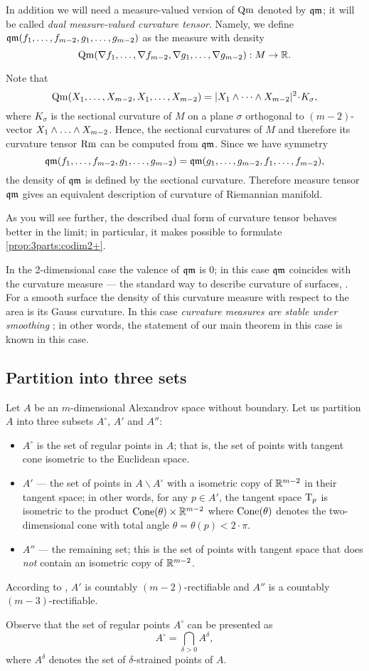 In addition we will need a measure-valued version of $\operatorname{\rm Qm}$ denoted by $\operatorname{\mathfrak{qm}}$;
it will be called \emph{dual measure-valued curvature tensor}.
Namely, we define $\qm(f_1,\zz\dots,f_{m-2},g_1,\zz\dots,g_{m-2})$ as the measure with density
\[\operatorname{\rm Qm}(\nabla f_1,\dots,\nabla f_{m-2},\nabla g_1,\dots,\nabla g_{m-2}): M\to\mathbb{R}.\]

Note that 
$$\Qm(X_1,\dots,X_{m-2},X_1,\dots,X_{m-2})
=
|X_1\wedge\dots \wedge X_{m-2}|^2\cdot K_\sigma, $$
where $K_\sigma$ is the sectional curvature of $M$ 
on a plane $\sigma$ orthogonal to $(m-2)$-vector
$X_1\wedge\zz\dots \wedge X_{m-2}$.
Hence, the sectional curvatures of $M$ and therefore its curvature tensor $\operatorname{\rm Rm}$ can  be computed from
$\operatorname{\mathfrak{qm}}$.
Since we have symmetry
$$\operatorname{\mathfrak{qm}}(f_1,\dots,f_{m-2},g_1,\dots,g_{m-2})=
\operatorname{\mathfrak{qm}}(g_1,\dots,g_{m-2},f_1,\dots,f_{m-2}),$$
the density of $\operatorname{\mathfrak{qm}}$ is defined by the sectional curvature.
Therefore measure tensor $\operatorname{\mathfrak{qm}}$
gives an equivalent description of curvature of Riemannian manifold.

As you will see further, the described dual form of curvature tensor behaves better in the limit;
in particular, it makes possible to formulate \ref{prop:3parts:codim2+}.

In the 2-dimensional case the valence of $\operatorname{\mathfrak{qm}}$ is $0$;
in this case $\operatorname{\mathfrak{qm}}$ coincides with the curvature measure --- the standard way to describe curvature of surfaces, 
\cite{Resh,AZ}.
For a smooth surface the density of this curvature measure with respect to the area
is its Gauss curvature.
In this case \emph{curvature measures are stable under smoothing} \cite[VII \S13]{AZ};
in other words, the statement of our main theorem in this case
is known in this case.


\subsection{Partition into three sets}\label{subsec:AAA}

Let $A$ be an $m$-dimensional Alexandrov space without boundary. 
Let us partition $A$ into three subsets $A^\circ$, $A'$ and $A''$:
\begin{itemize}
\item $A^\circ$ is the set of regular points in $A$; that is, the set of points with tangent cone isometric to the Euclidean space.
\item $A'$ --- the set of points in $A\backslash A^\circ$ with a isometric copy of $\mathbb{R}^{m-2}$ in their tangent space;
in other words, for any $p\in A'$, the tangent space $\mathrm{T}_p$ is isometric to the product $\operatorname{Cone}(\theta)\times\mathbb{R}^{m-2}$ where $\operatorname{Cone}(\theta)$ denotes the two-dimensional cone with total angle $\theta=\theta(p)<2\cdot \pi$.
\item $A''$ --- the remaining set; this is the set of points with tangent space that does \emph{not} contain an isometric copy of $\mathbb{R}^{m-2}$.
\end{itemize}
According to \cite{li-naber}, $A'$ is countably $(m-2)$-rectifiable and $A''$ is a countably $(m-3)$-rectifiable. 

Observe that the set of regular points $A^\circ$ can be presented as
$$A^{\circ}=\bigcap_{\delta>0} A^\delta,$$
where $A^\delta$ denotes the set of $\delta$-strained points of $A$.
